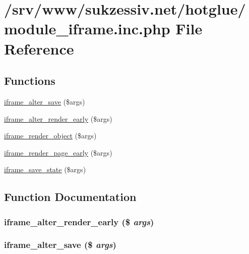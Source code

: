 \hypertarget{module__iframe_8inc_8php}{
\section{/srv/www/sukzessiv.net/hotglue/module\_\-iframe.inc.php File Reference}
\label{module__iframe_8inc_8php}
}
\subsection*{Functions}
\begin{CompactItemize}
\item 
\hyperlink{module__iframe_8inc_8php_2db93d83522681e256287e019fe40abc}{iframe\_\-alter\_\-save} (\$args)
\item 
\hyperlink{module__iframe_8inc_8php_7a5d09a45f06d9fd866f3c7679c14db2}{iframe\_\-alter\_\-render\_\-early} (\$args)
\item 
\hyperlink{module__iframe_8inc_8php_40856482f79fb837bc538e8eed66aff4}{iframe\_\-render\_\-object} (\$args)
\item 
\hyperlink{module__iframe_8inc_8php_d4d8fd8256a19beb570193c2886659e5}{iframe\_\-render\_\-page\_\-early} (\$args)
\item 
\hyperlink{module__iframe_8inc_8php_3034fcc475334b511b91932918fcfe57}{iframe\_\-save\_\-state} (\$args)
\end{CompactItemize}


\subsection{Function Documentation}
\hypertarget{module__iframe_8inc_8php_7a5d09a45f06d9fd866f3c7679c14db2}{
\subsubsection[{iframe\_\-alter\_\-render\_\-early}]{\setlength{\rightskip}{0pt plus 5cm}iframe\_\-alter\_\-render\_\-early (\$ {\em args})}}
\label{module__iframe_8inc_8php_7a5d09a45f06d9fd866f3c7679c14db2}


\hypertarget{module__iframe_8inc_8php_2db93d83522681e256287e019fe40abc}{
\subsubsection[{iframe\_\-alter\_\-save}]{\setlength{\rightskip}{0pt plus 5cm}iframe\_\-alter\_\-save (\$ {\em args})}}
\label{module__iframe_8inc_8php_2db93d83522681e256287e019fe40abc}


